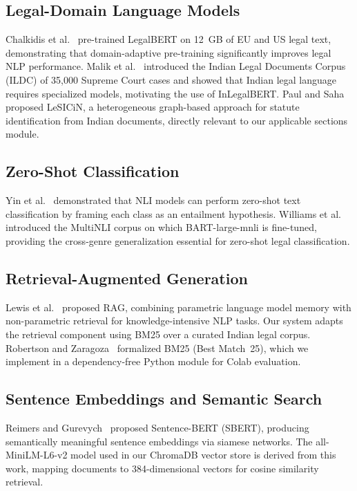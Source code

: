 \documentclass[conference]{IEEEtran}
\begin{document}
\subsection{Legal-Domain Language Models}

Chalkidis et al.~\cite{chalkidis2020legalbert} pre-trained LegalBERT on 12~GB
of EU and US legal text, demonstrating that domain-adaptive pre-training
significantly improves legal NLP performance. Malik et al.~\cite{malik2021ildc}
introduced the Indian Legal Documents Corpus (ILDC) of 35{,}000 Supreme Court
cases and showed that Indian legal language requires specialized models,
motivating the use of InLegalBERT. Paul and Saha~\cite{paul2023lesicin}
proposed LeSICiN, a heterogeneous graph-based approach for statute
identification from Indian documents, directly relevant to our applicable
sections module.

\subsection{Zero-Shot Classification}

Yin et al.~\cite{yin2019zeroshot} demonstrated that NLI models can perform
zero-shot text classification by framing each class as an entailment hypothesis.
Williams et al.~\cite{williams2018mnli} introduced the MultiNLI corpus on
which BART-large-mnli is fine-tuned, providing the cross-genre generalization
essential for zero-shot legal classification.

\subsection{Retrieval-Augmented Generation}

Lewis et al.~\cite{lewis2020rag} proposed RAG, combining parametric language
model memory with non-parametric retrieval for knowledge-intensive NLP tasks.
Our system adapts the retrieval component using BM25 over a curated Indian
legal corpus. Robertson and Zaragoza~\cite{robertson2009bm25} formalized BM25
(Best Match~25), which we implement in a dependency-free Python module for
Colab evaluation.

\subsection{Sentence Embeddings and Semantic Search}

Reimers and Gurevych~\cite{reimers2019sbert} proposed Sentence-BERT (SBERT),
producing semantically meaningful sentence embeddings via siamese networks.
The all-MiniLM-L6-v2 model used in our ChromaDB vector store is derived from
this work, mapping documents to 384-dimensional vectors for cosine similarity
retrieval.
\end{document}
